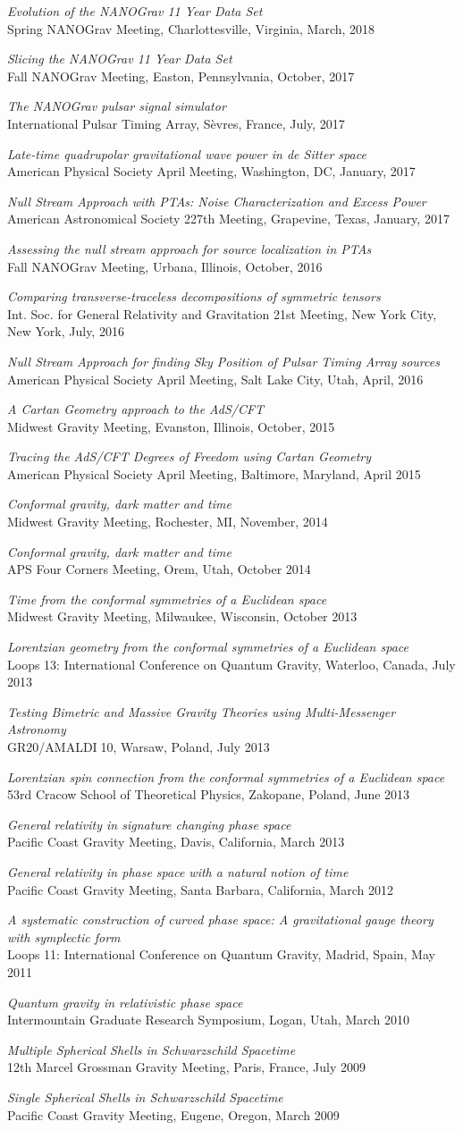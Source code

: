 \documentclass[11pt,letterpaper,sans,unicode]{moderncv}
\newcommand{\talkitem}[3]{\item \textit{#1}\\{#2}, #3} %
\begin{document}
\begin{etaremune}[leftmargin=8mm]
\talkitem{Evolution of the NANOGrav 11 Year Data Set}{Spring NANOGrav Meeting}{Charlottesville, Virginia, March, 2018}
\talkitem{Slicing the NANOGrav 11 Year Data Set}{Fall NANOGrav Meeting} Easton, Pennsylvania, October, 2017
\talkitem{The NANOGrav pulsar signal simulator}{International Pulsar Timing Array}{S\`{e}vres, France, July, 2017}
\talkitem{Late-time quadrupolar gravitational wave power in de Sitter space}{American Physical Society April Meeting}{Washington, DC, January, 2017}
\talkitem{Null Stream Approach with PTAs: Noise Characterization and Excess Power}{American Astronomical Society 227th Meeting}{Grapevine, Texas, January, 2017}
\talkitem{Assessing the null stream approach for source localization in PTAs}{Fall NANOGrav Meeting}{Urbana, Illinois, October, 2016}
\talkitem{Comparing transverse-traceless decompositions of symmetric tensors}{Int. Soc. for General Relativity and Gravitation 21st Meeting}{New York City, New York, July, 2016}
\talkitem{Null Stream Approach for finding Sky Position of Pulsar Timing Array sources}{American Physical Society April Meeting}{Salt Lake City, Utah, April, 2016}
\talkitem{A Cartan Geometry approach to the AdS/CFT}{Midwest Gravity Meeting}{Evanston, Illinois, October, 2015}
\talkitem{Tracing the AdS/CFT Degrees of Freedom using Cartan Geometry}{American Physical Society April Meeting}{Baltimore, Maryland, April 2015}
\talkitem{Conformal gravity, dark matter and time}{Midwest Gravity Meeting}{Rochester, MI, November, 2014}
\talkitem{Conformal gravity, dark matter and time}{APS Four Corners Meeting}{Orem, Utah, October 2014}
\talkitem{Time from the conformal symmetries of a Euclidean space}{Midwest Gravity Meeting} Milwaukee, Wisconsin, October 2013
\talkitem{Lorentzian geometry from the conformal symmetries of a Euclidean space}{Loops 13: International Conference on Quantum Gravity}{Waterloo, Canada, July 2013}
\talkitem{Testing Bimetric and Massive Gravity Theories using Multi-Messenger Astronomy}{GR20/AMALDI$\;$10}{Warsaw, Poland, July 2013}
\talkitem{Lorentzian spin connection from the conformal symmetries of a Euclidean space}{53rd Cracow School of Theoretical Physics}{Zakopane, Poland, June 2013}
\talkitem{General relativity in signature changing phase space}{Pacific Coast Gravity Meeting}{Davis, California, March 2013}
\talkitem{General relativity in phase space with a natural notion of time}{Pacific Coast Gravity Meeting}{Santa Barbara, California, March 2012}
\talkitem{A systematic construction of curved phase space: A gravitational gauge theory with symplectic form}{Loops 11: International Conference on Quantum Gravity}{Madrid, Spain, May 2011}
\talkitem{Quantum gravity in relativistic phase space}{Intermountain Graduate Research Symposium}{Logan, Utah, March 2010}
\talkitem{Multiple Spherical Shells in Schwarzschild Spacetime}{12th Marcel Grossman Gravity Meeting}{Paris, France, July 2009}
\talkitem{Single Spherical Shells in Schwarzschild Spacetime}{Pacific Coast Gravity Meeting}{Eugene, Oregon, March 2009}


\end{etaremune}
\end{document}
